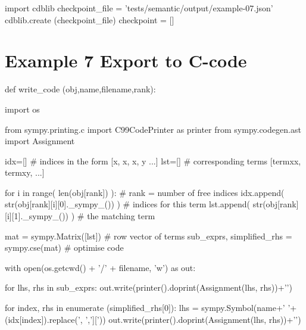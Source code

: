 \documentclass[12pt]{cdblatex}
\begin{document}
\bgroup
{}
\begin{cadabra}
   import cdblib
   checkpoint_file = 'tests/semantic/output/example-07.json'
   cdblib.create (checkpoint_file)
   checkpoint = []
\end{cadabra}
\egroup

\clearpage

\section*{Example 7 Export to C-code}

\begin{cadabra}
   def write_code (obj,name,filename,rank):

      import os

      from sympy.printing.c import C99CodePrinter as printer
      from sympy.codegen.ast import Assignment

      idx=[]  # indices in the form [{x, x}, {x, y} ...]
      lst=[]  # corresponding terms [termxx, termxy, ...]

      for i in range( len(obj[rank]) ):                 # rank = number of free indices
          idx.append( str(obj[rank][i][0]._sympy_()) )  # indices for this term
          lst.append( str(obj[rank][i][1]._sympy_()) )  # the matching term

      mat = sympy.Matrix([lst])                         # row vector of terms
      sub_exprs, simplified_rhs = sympy.cse(mat)        # optimise code

      with open(os.getcwd() + '/' + filename, 'w') as out:

         for lhs, rhs in sub_exprs:
            out.write(printer().doprint(Assignment(lhs, rhs))+'\n')

         for index, rhs in enumerate (simplified_rhs[0]):
            lhs = sympy.Symbol(name+' '+(idx[index]).replace(', ',']['))
            out.write(printer().doprint(Assignment(lhs, rhs))+'\n')
\end{cadabra}

\clearpage
\end{document}
